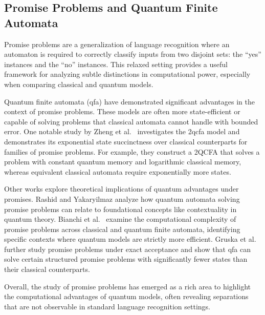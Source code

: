\subsection{Promise Problems and Quantum Finite Automata}

Promise problems are a generalization of language recognition where an automaton is required to correctly classify inputs from two disjoint sets: the “yes” instances and the “no” instances. This relaxed setting provides a useful framework for analyzing subtle distinctions in computational power, especially when comparing classical and quantum models.

Quantum finite automata (\gls{qfa}) have demonstrated significant advantages in the context of promise problems. These models are often more state-efficient or capable of solving problems that classical automata cannot handle with bounded error. One notable study by Zheng et al.\ \cite{zheng2013state} investigates the \gls{2qcfa} model and demonstrates its exponential state succinctness over classical counterparts for families of promise problems. For example, they construct a 2QCFA that solves a problem with constant quantum memory and logarithmic classical memory, whereas equivalent classical automata require exponentially more states.

Other works explore theoretical implications of quantum advantages under promises. Rashid and Yakaryilmaz \cite{rashid2014implications} analyze how quantum automata solving promise problems can relate to foundational concepts like contextuality in quantum theory. Bianchi et al.\ \cite{bianchi2014complexity} examine the computational complexity of promise problems across classical and quantum finite automata, identifying specific contexts where quantum models are strictly more efficient. Gruska et al.\ \cite{gruska2015potential} further study promise problems under exact acceptance and show that \gls{qfa} can solve certain structured promise problems with significantly fewer states than their classical counterparts.

Overall, the study of promise problems has emerged as a rich area to highlight the computational advantages of quantum models, often revealing separations that are not observable in standard language recognition settings.
